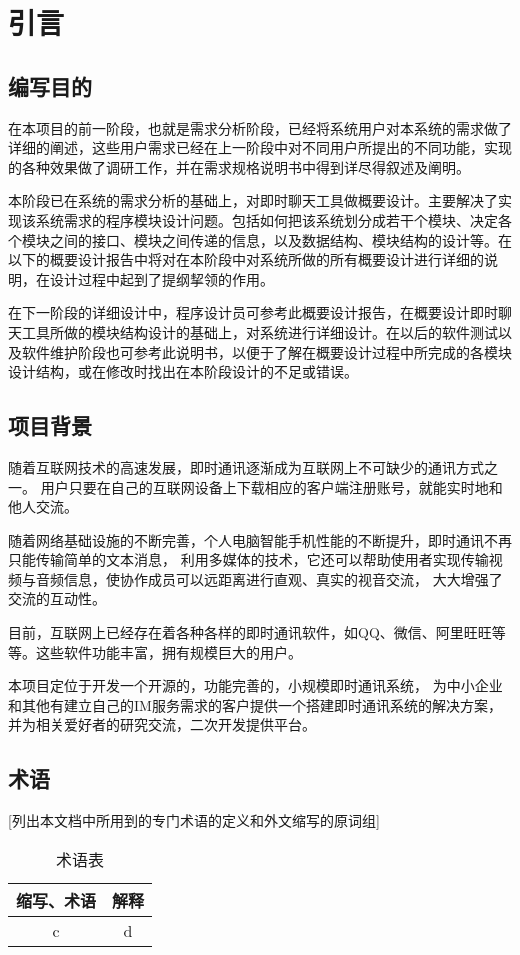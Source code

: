 \chapter{引言}
\section{编写目的}
在本项目的前一阶段，也就是需求分析阶段，已经将系统用户对本系统的需求做了详细的阐述，这些用户需求已经在上一阶段中对不同用户所提出的不同功能，实现的各种效果做了调研工作，并在需求规格说明书中得到详尽得叙述及阐明。

本阶段已在系统的需求分析的基础上，对即时聊天工具做概要设计。主要解决了实现该系统需求的程序模块设计问题。包括如何把该系统划分成若干个模块、决定各个模块之间的接口、模块之间传递的信息，以及数据结构、模块结构的设计等。在以下的概要设计报告中将对在本阶段中对系统所做的所有概要设计进行详细的说明，在设计过程中起到了提纲挈领的作用。

在下一阶段的详细设计中，程序设计员可参考此概要设计报告，在概要设计即时聊天工具所做的模块结构设计的基础上，对系统进行详细设计。在以后的软件测试以及软件维护阶段也可参考此说明书，以便于了解在概要设计过程中所完成的各模块设计结构，或在修改时找出在本阶段设计的不足或错误。


\section{项目背景}
随着互联网技术的高速发展，即时通讯逐渐成为互联网上不可缺少的通讯方式之一。
用户只要在自己的互联网设备上下载相应的客户端注册账号，就能实时地和他人交流。

随着网络基础设施的不断完善，个人电脑智能手机性能的不断提升，即时通讯不再只能传输简单的文本消息，
利用多媒体的技术，它还可以帮助使用者实现传输视频与音频信息，使协作成员可以远距离进行直观、真实的视音交流，
大大增强了交流的互动性。

目前，互联网上已经存在着各种各样的即时通讯软件，如QQ、微信、阿里旺旺等等。这些软件功能丰富，拥有规模巨大的用户。

本项目定位于开发一个开源的，功能完善的，小规模即时通讯系统，
为中小企业和其他有建立自己的IM服务需求的客户提供一个搭建即时通讯系统的解决方案，
并为相关爱好者的研究交流，二次开发提供平台。

\section{术语}
[列出本文档中所用到的专门术语的定义和外文缩写的原词组]
\begin{table}[htbp]
\centering
\caption{术语表} \label{tab:terminology}
\begin{tabular}{|c|c|}
    \hline
    缩写、术语 & 解释 \\
    \hline
    c & d \\
    \hline
\end{tabular}
\end{table}